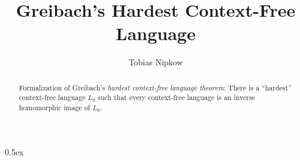 \documentclass[11pt,a4paper]{article}
\begin{document}
\title{Greibach's Hardest Context-Free Language}
\author{Tobias Nipkow}
\maketitle

\begin{abstract}
Formalization of Greibach's \cite{Greibach73} \emph{hardest context-free language theorem}:
There is a ``hardest'' context-free language $L_0$ such that every context-free language
is an inverse homomorphic image of $L_0$.
\end{abstract}

\parindent 0pt\parskip 0.5ex





\end{document}
